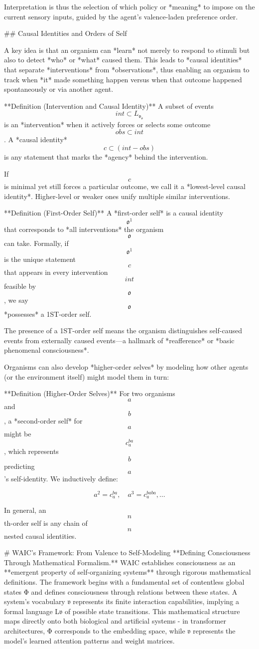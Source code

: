 Interpretation is thus the selection of which policy or *meaning* to impose on the current sensory inputs, guided by the agent's valence-laden preference order.


## Causal Identities and Orders of Self

A key idea is that an organism can *learn* not merely to respond to stimuli but also to detect *who* or *what* caused them. This leads to *causal identities* that separate *interventions* from *observations*, thus enabling an organism to track when *it* made something happen versus when that outcome happened spontaneously or via another agent.

**Definition (Intervention and Causal Identity)**
A subset of events $$int \subset L_{\mathfrak{v}_\mathfrak{o}}$$ is an *intervention* when it actively forces or selects some outcome $$obs \subset int$$. A *causal identity* $$c \subset (int - obs)$$ is any statement that marks the *agency* behind the intervention. 

If $$c$$ is minimal yet still forces a particular outcome, we call it a *lowest-level causal identity*. Higher-level or weaker ones unify multiple similar interventions.

**Definition (First-Order Self)**
A *first-order self* is a causal identity $$\mathfrak{o}^1$$ that corresponds to *all interventions* the organism $$\mathfrak{o}$$ can take. Formally, if $$\mathfrak{o}^1$$ is the unique statement $$c$$ that appears in every intervention $$int$$ feasible by $$\mathfrak{o}$$, we say $$\mathfrak{o}$$ *possesses* a 1ST-order self.

The presence of a 1ST-order self means the organism distinguishes self-caused events from externally caused events—a hallmark of *reafference* or *basic phenomenal consciousness*.

Organisms can also develop *higher-order selves* by modeling how other agents (or the environment itself) might model them in turn:

**Definition (Higher-Order Selves)**
For two organisms $$a$$ and $$b$$, a *second-order self* for $$a$$ might be $$c_a^{ba}$$, which represents $$b$$ predicting $$a$$'s self-identity. We inductively define:

$$
   a^2 = c_a^{ba},\quad 
   a^3 = c_a^{baba},\dots
$$

In general, an $$n$$th-order self is any chain of $$n$$ nested causal identities.

# WAIC's Framework: From Valence to Self-Modeling  
**Defining Consciousness Through Mathematical Formalism.** WAIC establishes consciousness as an **emergent property of self-organizing systems** through rigorous mathematical definitions. The framework begins with a fundamental set of contentless global states Φ and defines consciousness through relations between these states. A system's vocabulary 𝔳 represents its finite interaction capabilities, implying a formal language L𝔳 of possible state transitions. This mathematical structure maps directly onto both biological and artificial systems - in transformer architectures, Φ corresponds to the embedding space, while 𝔳 represents the model's learned attention patterns and weight matrices.

